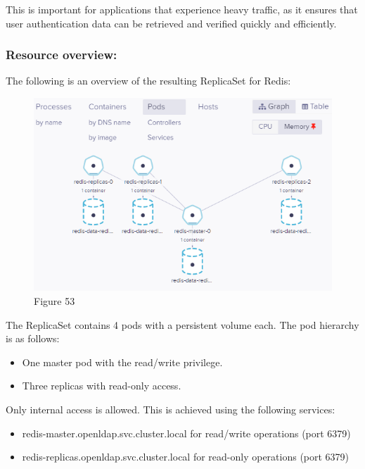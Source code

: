 This is important for applications that experience heavy traffic, as it ensures that user authentication data can be retrieved and verified quickly and efficiently. 

\subsubsection{Resource overview: }

The following is an overview of the resulting ReplicaSet for Redis: 

\begin{figure}[H]\centering
\includegraphics[width=1.0\textwidth,angle=00]{assets/f53.png}
\caption{Figure 53 }
\label{fig:f53}
\end{figure}

The ReplicaSet contains 4 pods with a persistent volume each. The pod hierarchy is as follows: 
\begin{itemize}[label={--}]
\item One master pod with the read/write privilege. 
\item Three replicas with read-only access. 
\end{itemize}
Only internal access is allowed. This is achieved using the following services: 

\begin{itemize}[label={--}]
\item redis-master.openldap.svc.cluster.local for read/write operations (port 6379) 
\item redis-replicas.openldap.svc.cluster.local for read-only operations (port 6379) 
\end{itemize}



